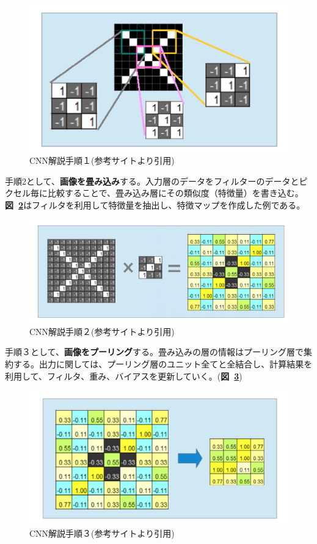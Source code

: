 \documentclass[a4paper, 11pt, titlepage]{jsarticle}
\begin{document}
\begin{figure}[h]
  \centering
  \includegraphics[scale=0.4]{tex_pic/cnn1.png}
  \caption{CNN解説手順１(参考サイト\cite{cnn}より引用)}
  \label{cnn1}
\end{figure}


手順2として、\textbf{画像を畳み込み}する。入力層のデータをフィルターのデータとピクセル毎に比較することで、畳み込み層にその類似度（特徴量）を書き込む。\textbf{図~\ref{cnn2}}はフィルタを利用して特徴量を抽出し、特徴マップを作成した例である。

\begin{figure}[h]
  \centering
  \includegraphics[scale=0.3]{tex_pic/cnn2.png}
  \caption{CNN解説手順２(参考サイト\cite{cnn}より引用)}
  \label{cnn2}
\end{figure}

手順３として、\textbf{画像をプーリング}する。畳み込みの層の情報はプーリング層で集約する。出力に関しては、プーリング層のユニット全てと全結合し、計算結果を利用して、フィルタ、重み、バイアスを更新していく。(\textbf{図~\ref{cnn3}})

\begin{figure}[h]
  \centering
  \includegraphics[scale=0.3]{tex_pic/cnn3.png}
  \caption{CNN解説手順３(参考サイト\cite{cnn}より引用)}
  \label{cnn3}
\end{figure}
\end{document}
